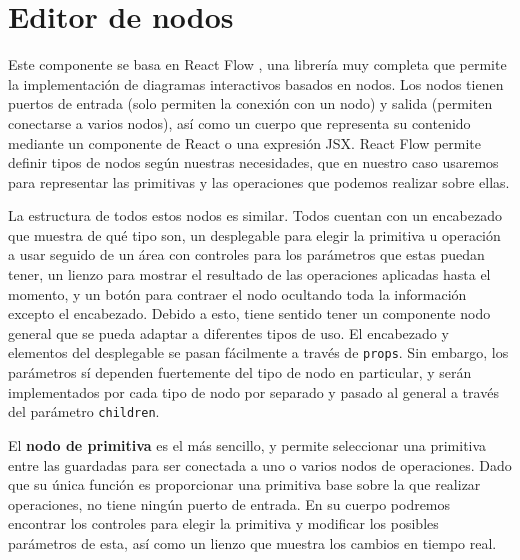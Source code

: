 \section{Editor de nodos}
Este componente se basa en React Flow \cite{react-flow}, una librería muy completa que permite la implementación de diagramas interactivos basados en nodos. Los nodos tienen puertos de entrada (solo permiten la conexión con un nodo) y salida (permiten conectarse a varios nodos), así como un cuerpo que representa su contenido mediante un componente de React o una expresión JSX. React Flow permite definir tipos de nodos según nuestras necesidades, que en nuestro caso usaremos para representar las primitivas y las operaciones que podemos realizar sobre ellas.\newline

La estructura de todos estos nodos es similar. Todos cuentan con un encabezado que muestra de qué tipo son, un desplegable para elegir la primitiva u operación a usar seguido de un área con controles para los parámetros que estas puedan tener, un lienzo para mostrar el resultado de las operaciones aplicadas hasta el momento, y un botón para contraer el nodo ocultando toda la información excepto el encabezado. Debido a esto, tiene sentido tener un componente nodo general que se pueda adaptar a diferentes tipos de uso. El encabezado y elementos del desplegable se pasan fácilmente a través de \texttt{props}. Sin embargo, los parámetros sí dependen fuertemente del tipo de nodo en particular, y serán implementados por cada tipo de nodo por separado y pasado al general a través del parámetro \texttt{children}.\newline

El \textbf{nodo de primitiva} es el más sencillo, y permite seleccionar una primitiva entre las guardadas para ser conectada a uno o varios nodos de operaciones. Dado que su única función es proporcionar una primitiva base sobre la que realizar operaciones, no tiene ningún puerto de entrada. En su cuerpo podremos encontrar los controles para elegir la primitiva y modificar los posibles parámetros de esta, así como un lienzo que muestra los cambios en tiempo real.\newline

